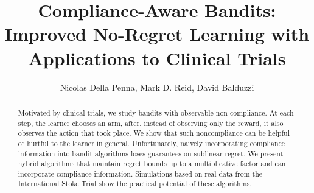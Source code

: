 \documentclass{article}
\title{
Compliance-Aware Bandits: Improved No-Regret Learning with Applications to Clinical Trials
}
\author{Nicolas Della Penna, Mark D. Reid, David Balduzzi}
\begin{document}
 

\maketitle

\begin{abstract} 
	Motivated by clinical trials, we study bandits with observable non-compliance. 
	At each step, the learner chooses an arm, after, instead of observing only the reward, it also observes the action that took place.
	We show that such noncompliance can be helpful or hurtful to the learner in general.
	Unfortunately, naively incorporating compliance information into bandit algorithms loses guarantees on sublinear regret.
	We present hybrid algorithms that maintain regret bounds up to a multiplicative factor and can incorporate compliance information.
	Simulations based on real data from the International Stoke Trial show the practical potential of these algorithms.
\end{abstract} 




%




{
\footnotesize


}



\end{document}
